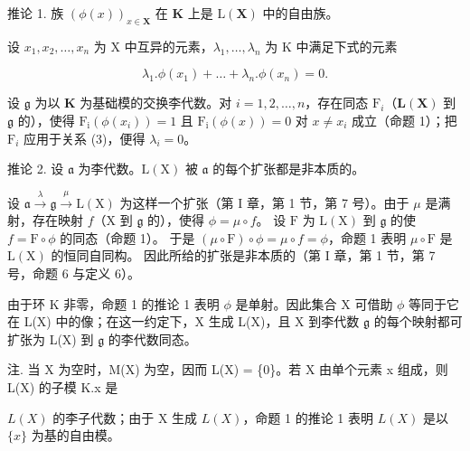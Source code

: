 推论 1. 族 \((\phi (x))_{x\in \mathbf{X}}\) 在 \(\mathbf{K}\) 上是 \(\mathrm{L}(\mathbf{X})\) 中的自由族。

设 \(x_{1}, x_{2}, \ldots, x_{n}\) 为 X 中互异的元素，\(\lambda_{1}, \ldots, \lambda_{n}\) 为 K 中满足下式的元素

\[
\lambda_ {1}. \phi (x _ {1}) + \dots + \lambda_ {n}. \phi (x _ {n}) = 0.\tag{3}
\]

设 \(\mathfrak{g}\) 为以 \(\mathbf{K}\) 为基础模的交换李代数。对 \(i = 1,2,\ldots ,n\)，存在同态 \(\mathrm{F}_i\)（\(\mathbf{L}(\mathbf{X})\) 到 \(\mathfrak{g}\) 的），使得 \(\mathrm{F_i}(\phi (x_i)) = 1\) 且 \(\mathrm{F_i}(\phi (x)) = 0\) 对 \(x\neq x_{i}\) 成立（命题 1）；把 \(\mathrm{F}_i\) 应用于关系 (3)，便得 \(\lambda_{i} = 0\)。

推论 2. 设 \(\mathfrak{a}\) 为李代数。\(\mathrm{L}(\mathrm{X})\) 被 \(\mathfrak{a}\) 的每个扩张都是非本质的。

设 \(\mathfrak{a} \xrightarrow{\lambda} \mathfrak{g} \xrightarrow{\mu} \mathrm{L}(\mathrm{X})\) 为这样一个扩张（第 I 章，第 1 节，第 7 号）。由于 \(\mu\) 是满射，存在映射 \(f\)（\(\mathrm{X}\) 到 \(\mathfrak{g}\) 的），使得 \(\phi = \mu \circ f\)。 设 \(\mathrm{F}\) 为 \(\mathrm{L}(\mathrm{X})\) 到 \(\mathfrak{g}\) 的使 \(f = \mathrm{F} \circ \phi\) 的同态（命题 1）。 于是 \((\mu \circ \mathrm{F}) \circ \phi = \mu \circ f = \phi\)，命题 1 表明 \(\mu \circ \mathrm{F}\) 是 \(\mathrm{L}(\mathrm{X})\) 的恒同自同构。 因此所给的扩张是非本质的（第 I 章，第 1 节，第 7 号，命题 6 与定义 6）。

由于环 K 非零，命题 1 的推论 1 表明 \(\phi\) 是单射。因此集合 X 可借助 \(\phi\) 等同于它在 L(X) 中的像；在这一约定下，X 生成 L(X)，且 X 到李代数 \(\mathfrak{g}\) 的每个映射都可扩张为 L(X) 到 \(\mathfrak{g}\) 的李代数同态。

注. 当 X 为空时，M(X) 为空，因而 L(X) = \{0\}。若 X 由单个元素 x 组成，则 L(X) 的子模 K.x 是

\(L(X)\) 的李子代数；由于 X 生成 \(L(X)\)，命题 1 的推论 1 表明 \(L(X)\) 是以 \(\{x\}\) 为基的自由模。

